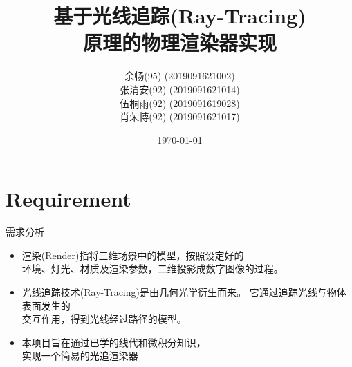 \documentclass{beamer}
\begin{document}
\title[\sc Ray-Traing based Renderer]{\sc 基于光线追踪(Ray-Tracing) \\ 原理的物理渲染器实现}
\author{ \normalsize 余畅(95) \quad \tiny (2019091621002) \\
 \normalsize 张清安(92) \qquad \tiny (2019091621014) \\
 \normalsize 伍桐雨(92) \quad \tiny (2019091619028) \\
 \normalsize 肖荣博(92) \quad \tiny (2019091621017)}
\date{\today}
\frame{\titlepage}

\section{Requirement}
\begin{frame} {需求分析}
		\begin{itemize} [<+->]
\item 渲染(Render)指将三维场景中的模型，按照设定好的 \\ 环境、灯光、材质及渲染参数，二维投影成数字图像的过程。
\item 光线追踪技术(Ray-Tracing)是由几何光学衍生而来。 它通过追踪光线与物体表面发生的 \\ 交互作用，得到光线经过路径的模型。
\item 本项目旨在通过已学的线代和微积分知识，\\实现一个简易的光追渲染器
\end{itemize}
\end{frame}
\end{document}
